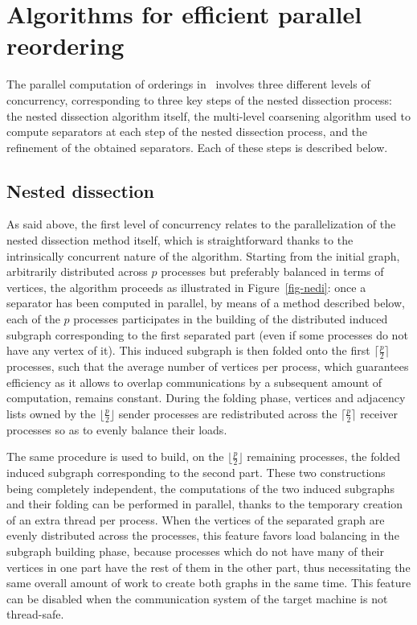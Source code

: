 \documentclass[fleqn,12pt,twoside]{article}
\begin{document}
\section{Algorithms for efficient parallel reordering}
\label{secalgo}

The parallel computation of orderings in \ptscotch\ involves three
different levels of concurrency, corresponding to three key steps of
the nested dissection process: the nested dissection algorithm itself,
the multi-level coarsening algorithm used to compute separators at
each step of the nested dissection process, and the refinement of the
obtained separators. Each of these steps is described below.

\subsection{Nested dissection}
\label{secalgond}

As said above, the first level of concurrency relates to the
parallelization of the nested dissection method itself, which is
straightforward thanks to the intrinsically concurrent nature of the
algorithm. Starting from the initial graph, arbitrarily distributed
across $p$ processes but preferably balanced in terms of vertices,
the algorithm proceeds as illustrated in Figure~\ref{fig-nedi}: once
a separator has been computed in parallel, by means of a method described
below, each of the $p$ processes participates in the building of the
distributed induced subgraph corresponding to the first separated part
(even if some processes do not have any vertex of it). This induced
subgraph is then folded onto the first $\lceil\frac{p}{2}\rceil$
processes, such that the average number of vertices per process,
which guarantees efficiency as it allows to overlap communications by
a subsequent amount of computation, remains constant. During the
folding phase, vertices and adjacency lists owned by the
$\lfloor\frac{p}{2}\rfloor$ sender processes are redistributed across
the $\lceil\frac{p}{2}\rceil$ receiver processes so as to evenly
balance their loads.

The same procedure is used to build, on the
$\lfloor\frac{p}{2}\rfloor$ remaining processes, the folded induced
subgraph corresponding to the second part. These two constructions
being completely independent, the computations of the two induced
subgraphs and their folding can be performed in parallel, thanks to the
temporary creation of an extra thread per process. When the vertices
of the separated graph are evenly distributed across the processes,
this feature favors load balancing in the subgraph building phase,
because processes which do not have many of their vertices in one part
have the rest of them in the other part, thus necessitating the
same overall amount of work to create both graphs in the same time. This
feature can be disabled when the communication system of the target
machine is not thread-safe.
\end{document}
